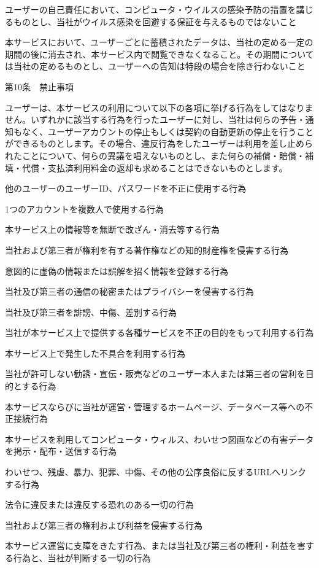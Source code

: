     ユーザーの自己責任において、コンピュータ・ウイルスの感染予防の措置を講じるものとし、当社がウイルス感染を回避する保証を与えるものではないこと

    本サービスにおいて、ユーザーごとに蓄積されたデータは、当社の定める一定の期間の後に消去され、本サービス内で閲覧できなくなること。その期間については当社の定めるものとし、ユーザーへの告知は特段の場合を除き行わないこと

第10条　禁止事項

ユーザーは、本サービスの利用について以下の各項に挙げる行為をしてはなりません。いずれかに該当する行為を行ったユーザーに対し、当社は何らの予告・通知もなく、ユーザーアカウントの停止もしくは契約の自動更新の停止を行うことができるものとします。その場合、違反行為をしたユーザーは利用を差し止められたことについて、何らの異議を唱えないものとし、また何らの補償・賠償・補填・代償・支払済利用料金の返却も求めることはできないものとします。

    他のユーザーのユーザーID、パスワードを不正に使用する行為

    1つのアカウントを複数人で使用する行為

    本サービス上の情報等を無断で改ざん・消去等する行為

    当社および第三者が権利を有する著作権などの知的財産権を侵害する行為

    意図的に虚偽の情報または誤解を招く情報を登録する行為

    当社及び第三者の通信の秘密またはプライバシーを侵害する行為

    当社及び第三者を誹謗、中傷、差別する行為

    当社が本サービス上で提供する各種サービスを不正の目的をもって利用する行為

    本サービス上で発生した不具合を利用する行為

    当社が許可しない勧誘・宣伝・販売などのユーザー本人または第三者の営利を目的とする行為

    本サービスならびに当社が運営・管理するホームページ、データベース等への不正接続行為

    本サービスを利用してコンピュータ・ウィルス、わいせつ図画などの有害データを掲示・配布・送信する行為

    わいせつ、残虐、暴力、犯罪、中傷、その他の公序良俗に反するURLへリンクする行為

    法令に違反または違反する恐れのある一切の行為

    当社および第三者の権利および利益を侵害する行為

    本サービス運営に支障をきたす行為、または当社及び第三者の権利・利益を害する行為と、当社が判断する一切の行為

